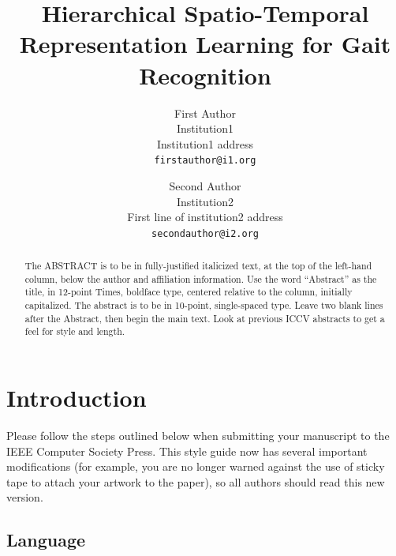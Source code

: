 \documentclass[10pt,twocolumn,letterpaper]{article}
\begin{document}
\title{Hierarchical Spatio-Temporal Representation Learning for Gait Recognition}

\author{First Author\\
Institution1\\
Institution1 address\\
{\tt\small firstauthor@i1.org}
\and
Second Author\\
Institution2\\
First line of institution2 address\\
{\tt\small secondauthor@i2.org}
}

\maketitle
\ificcvfinal\thispagestyle{empty}\fi

\begin{abstract}
   The ABSTRACT is to be in fully-justified italicized text, at the top
   of the left-hand column, below the author and affiliation
   information. Use the word ``Abstract'' as the title, in 12-point
   Times, boldface type, centered relative to the column, initially
   capitalized. The abstract is to be in 10-point, single-spaced type.
   Leave two blank lines after the Abstract, then begin the main text.
   Look at previous ICCV abstracts to get a feel for style and length.
\end{abstract}

\section{Introduction}

Please follow the steps outlined below when submitting your manuscript to
the IEEE Computer Society Press.  This style guide now has several
important modifications (for example, you are no longer warned against the
use of sticky tape to attach your artwork to the paper), so all authors
should read this new version.

\subsection{Language}
\end{document}
